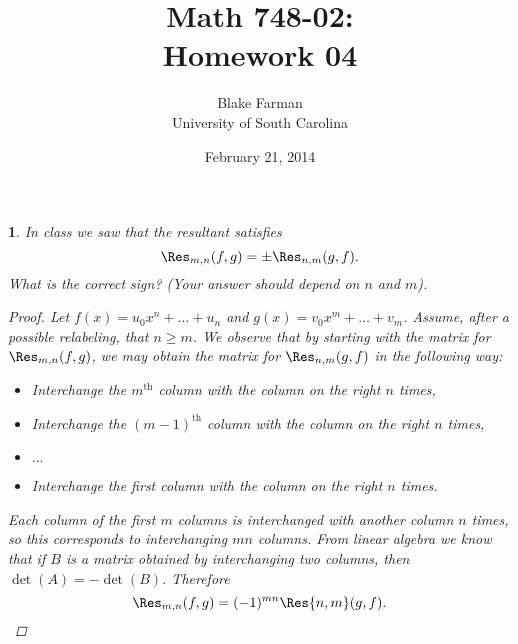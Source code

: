 \documentclass[10pt]{amsart}
\author{Blake Farman\\University of South Carolina}
\title{Math 748-02:\\Homework 04}
\date{February 21, 2014}
\begin{document}
\maketitle

\providecommand{\p}{\mathfrak{p}}
\providecommand{\m}{\mathfrak{m}}
\providecommand{\Deck}[1]{\operatorname{Deck}\left(#1\right)}

\newtheorem{thm}{}
\newtheorem{lem}{Lemma}
\newtheorem{prop}{Proposition}
\theoremstyle{definition}
\newtheorem{defn}{Definition}[thm]

\newcommand{\A}{\mathbb{A}}

\begin{thm}
  In class we saw that the resultant satisfies
  $$\Res_{m,n}(f,g) = \pm \Res_{n,m}(g,f).$$
  What is the correct sign? (Your answer should depend on $n$ and $m$).
  
  \begin{proof}
    Let $f(x) = u_0x^n + \ldots + u_n$ and $g(x) = v_0x^m + \ldots + v_m$.
    Assume, after a possible relabeling, that $n \geq m$.
    We observe that by starting with the matrix for $\Res_{m,n}(f,g)$, we may obtain the matrix for $\Res_{n,m}(g,f)$ in the following way:  
    \begin{itemize}
    \item
      Interchange the $m^\text{th}$ column with the column on the right $n$ times,
    \item
      Interchange the $(m-1)^\text{th}$ column with the column on the right $n$ times,
    \item
      $\ldots$
    \item
      Interchange the first column with the column on the right $n$ times.
    \end{itemize}
    Each column of the first $m$ columns is interchanged with another column $n$ times, so this corresponds to interchanging $mn$ columns.
    From linear algebra we know that if $B$ is a matrix obtained by interchanging two columns, then $\det(A) = -\det(B)$.
    Therefore
    $$\Res_{m,n}(f,g) = (-1)^{mn}\Res{n,m}(g,f).$$
  \end{proof}
\end{thm}
\end{document}
